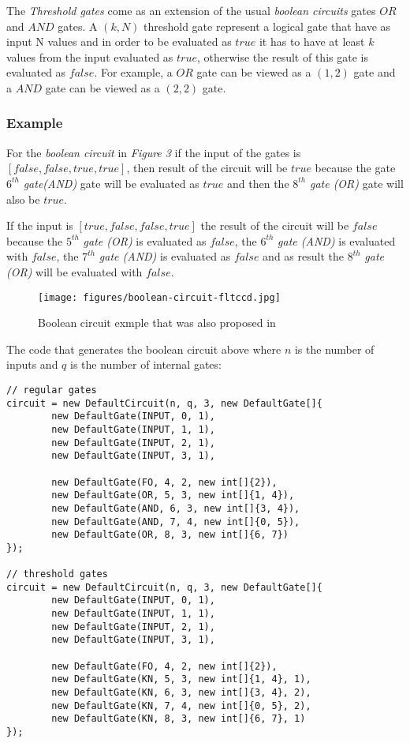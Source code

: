 \documentclass[12pt]{article}
\begin{document}
The \textit{Threshold gates} come as an extension of the usual \textit{boolean circuits} gates $OR$ and $AND$ gates. A $(k, N)$ threshold gate represent a logical gate that have as input N values and in order to be evaluated as $true$ it has to have at least $k$ values from the input evaluated as $true$, otherwise the result of this gate is evaluated as $false$. For example, a $OR$ gate can be viewed as a $(1, 2)$ gate and a $AND$ gate can be viewed as a $(2, 2)$ gate.

\subsubsection{Example}

For the \textit{boolean circuit} in \textit{Figure 3} if the input of the gates is $[false, false, true, true]$, then result of the circuit will be $true$ because the gate $6^{th}$\textit{ gate(AND)} gate will be evaluated as $true$ and then the $8^{th}$\textit{ gate (OR)} gate will also be $true$.

If the input is $[true, false, false, true]$ the result of the circuit will be $false$ because the  $5^{th}$\textit{ gate (OR)} is evaluated as $false$, the $6^{th}$\textit{ gate (AND)} is evaluated with $false$, the $7^{th}$\textit{ gate (AND)} is evaluated as $false$ and as result the $8^{th}$\textit{ gate (OR)} will be evaluated with $false$.

\begin{center}
	\begin{figure}[htpb]
\centering
\texttt{[image: figures/boolean-circuit-fltccd.jpg]}
\caption{
    Boolean circuit exmple that was also proposed in \cite{fltccd}
}
\end{figure}
\end{center}

The code that generates the boolean circuit above where $n$ is the number of inputs and $q$ is the number of internal gates:

\begin{lstlisting}
// regular gates
circuit = new DefaultCircuit(n, q, 3, new DefaultGate[]{
        new DefaultGate(INPUT, 0, 1),
        new DefaultGate(INPUT, 1, 1),
        new DefaultGate(INPUT, 2, 1),
        new DefaultGate(INPUT, 3, 1),

        new DefaultGate(FO, 4, 2, new int[]{2}),
        new DefaultGate(OR, 5, 3, new int[]{1, 4}),
        new DefaultGate(AND, 6, 3, new int[]{3, 4}),
        new DefaultGate(AND, 7, 4, new int[]{0, 5}),
        new DefaultGate(OR, 8, 3, new int[]{6, 7})
});

// threshold gates
circuit = new DefaultCircuit(n, q, 3, new DefaultGate[]{
        new DefaultGate(INPUT, 0, 1),
        new DefaultGate(INPUT, 1, 1),
        new DefaultGate(INPUT, 2, 1),
        new DefaultGate(INPUT, 3, 1),

        new DefaultGate(FO, 4, 2, new int[]{2}),
        new DefaultGate(KN, 5, 3, new int[]{1, 4}, 1),
        new DefaultGate(KN, 6, 3, new int[]{3, 4}, 2),
        new DefaultGate(KN, 7, 4, new int[]{0, 5}, 2),
        new DefaultGate(KN, 8, 3, new int[]{6, 7}, 1)
});
\end{lstlisting} 
\end{document}
